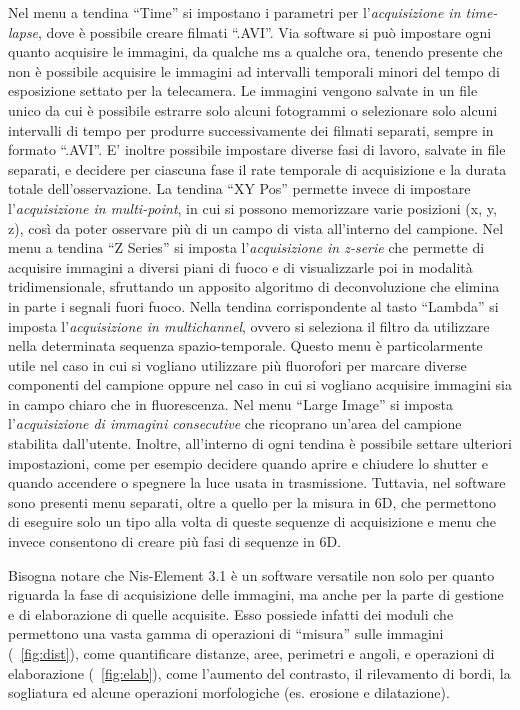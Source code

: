 Nel menu a tendina ``Time'' si impostano i parametri per l'\textit{acquisizione in time-lapse}, dove è possibile creare filmati ``.AVI''. 
Via software si può impostare ogni quanto acquisire le immagini, da qualche ms a qualche ora, tenendo presente che non è possibile acquisire le immagini ad intervalli temporali minori del tempo di esposizione settato per la telecamera. 
Le immagini vengono salvate in un file unico da cui è possibile estrarre solo alcuni fotogrammi o selezionare solo alcuni intervalli di tempo per produrre successivamente dei filmati separati, sempre in formato ``.AVI''. 
E' inoltre possibile impostare diverse fasi di lavoro, salvate in file separati, e decidere per ciascuna fase il rate temporale di acquisizione e la durata totale dell'osservazione. 
La tendina ``XY Pos'' permette invece di impostare l'\textit{acquisizione in multi-point}, in cui si possono memorizzare varie posizioni (x, y, z), così da poter osservare più di un campo di vista all'interno del campione. 
Nel menu a tendina ``Z Series'' si imposta l'\textit{acquisizione in z-serie} che permette di acquisire immagini a diversi piani di fuoco e di visualizzarle poi in modalità tridimensionale, sfruttando un apposito algoritmo di deconvoluzione che elimina in parte i segnali fuori fuoco.
Nella tendina corrispondente al tasto ``Lambda'' si imposta l'\textit{acquisizione in multichannel}, ovvero si seleziona il filtro da utilizzare nella determinata sequenza spazio-temporale. 
Questo menu è particolarmente utile nel caso in cui si vogliano utilizzare più fluorofori per marcare diverse componenti del campione oppure nel caso in cui si vogliano acquisire immagini sia in campo chiaro che in fluorescenza. 
Nel menu ``Large Image'' si imposta l'\textit{acquisizione di immagini consecutive} che ricoprano un'area del campione stabilita dall'utente.
Inoltre, all'interno di ogni tendina è possibile settare ulteriori impostazioni, come per esempio decidere quando aprire e chiudere lo shutter e quando accendere o spegnere la luce usata in trasmissione.
Tuttavia, nel software sono presenti menu separati, oltre a quello per la misura in 6D, che permettono di eseguire solo un tipo alla volta di queste sequenze di acquisizione e menu che invece consentono di creare più fasi di sequenze in 6D.

Bisogna notare che Nis-Element 3.1 è un software versatile non solo per quanto riguarda la fase di acquisizione delle immagini, ma anche per la parte di gestione e di elaborazione di quelle acquisite. 
Esso possiede infatti dei moduli che permettono una vasta gamma di operazioni di ``misura'' sulle immagini (\figurename~\ref{fig:dist}), come quantificare distanze, aree, perimetri e angoli, e operazioni di elaborazione (\figurename~\ref{fig:elab}), come l'aumento del contrasto, il rilevamento di bordi, la sogliatura ed alcune operazioni morfologiche (es. erosione e dilatazione).

